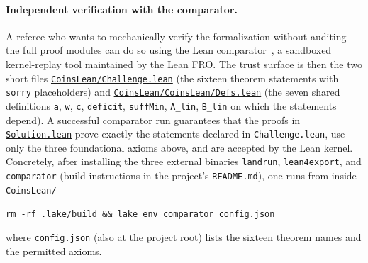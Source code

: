 \documentclass[12pt]{article}
\theoremstyle{definition}
\theoremstyle{remark}
\begin{document}
\paragraph{Independent verification with the comparator.}
A referee who wants to mechanically verify the formalization
without auditing the full proof modules can do so using the Lean
comparator~\cite{LeanComparator}, a sandboxed kernel-replay tool
maintained by the Lean FRO.  The trust surface is then the two
short files
\href{https://github.com/pfaffelh/coins/blob/main/CoinsLean/Challenge.lean}{\texttt{CoinsLean/Challenge.lean}}
(the sixteen theorem statements with \texttt{sorry} placeholders)
and
\href{https://github.com/pfaffelh/coins/blob/main/CoinsLean/CoinsLean/Defs.lean}{\texttt{CoinsLean/CoinsLean/Defs.lean}}
(the seven shared definitions \texttt{a}, \texttt{w}, \texttt{c},
\texttt{deficit}, \texttt{suffMin}, \texttt{A\_lin}, \texttt{B\_lin}
on which the statements depend).  A successful comparator run
guarantees that the proofs in
\href{https://github.com/pfaffelh/coins/blob/main/CoinsLean/Solution.lean}{\texttt{Solution.lean}}
prove exactly the statements declared in \texttt{Challenge.lean},
use only the three foundational axioms above, and are accepted by
the Lean kernel.  Concretely, after installing the three external
binaries \texttt{landrun}, \texttt{lean4export}, and
\texttt{comparator} (build instructions in the project's
\texttt{README.md}), one runs from inside \texttt{CoinsLean/}
\begin{center}
  \texttt{rm -rf .lake/build \&\& lake env comparator config.json}
\end{center}
where \texttt{config.json} (also at the project root) lists the
sixteen theorem names and the permitted axioms.
\end{document}
